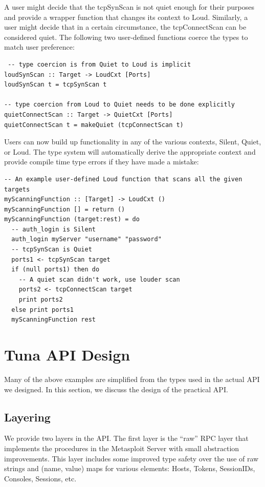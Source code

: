 \documentclass[figure,letterpaper,onefignum]{mysiam}
\begin{document}
A user might decide that the tcpSynScan is not quiet enough for their purposes and provide a wrapper function that changes its context to Loud. Similarly, a user might decide that in a certain circumstance, the tcpConnectScan can be considered quiet. The following two user-defined functions coerce the types to match user preference:

\begin{verbatim}
 -- type coercion is from Quiet to Loud is implicit
loudSynScan :: Target -> LoudCxt [Ports]
loudSynScan t = tcpSynScan t

-- type coercion from Loud to Quiet needs to be done explicitly
quietConnectScan :: Target -> QuietCxt [Ports]
quietConnectScan t = makeQuiet (tcpConnectScan t) 
\end{verbatim}

Users can now build up functionality in any of the various contexts, Silent, Quiet, or Loud. The type system will automatically derive the appropriate context and provide compile time type errors if they have made a mistake:

\begin{verbatim}
-- An example user-defined Loud function that scans all the given targets
myScanningFunction :: [Target] -> LoudCxt ()
myScanningFunction [] = return ()
myScanningFunction (target:rest) = do
  -- auth_login is Silent
  auth_login myServer "username" "password"
  -- tcpSynScan is Quiet
  ports1 <- tcpSynScan target
  if (null ports1) then do
    -- A quiet scan didn't work, use louder scan
    ports2 <- tcpConnectScan target
    print ports2
  else print ports1
  myScanningFunction rest
\end{verbatim}

\section{Tuna API Design}
Many of the above examples are simplified from the types used in the actual API we designed. In this section, we discuss the design of the practical API.

\subsection{Layering}
We provide two layers in the API. The first layer is the ``raw'' RPC layer that implements the procedures in the Metasploit Server with small abstraction improvements. This layer includes some improved type safety over the use of raw strings and (name, value) maps for various elements: Hosts, Tokens, SessionIDs, Consoles, Sessions, etc.
\end{document}
